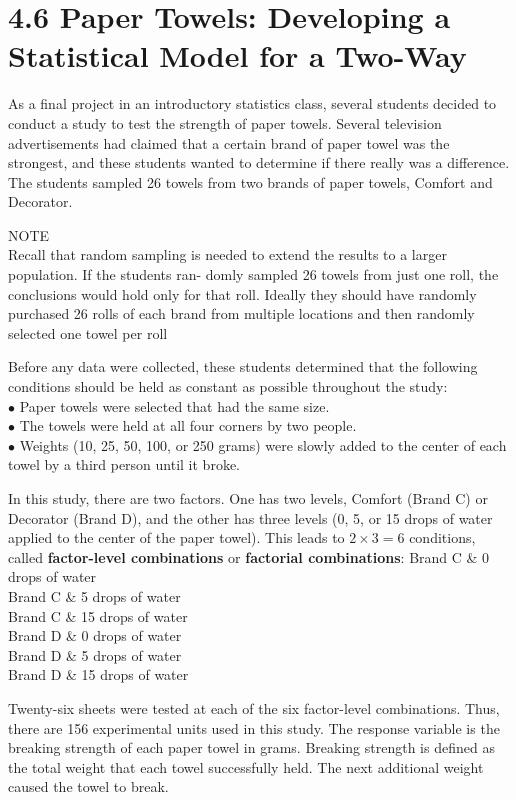 \documentclass[
]{report}
\begin{document}
\chapter{4.6 Paper Towels: Developing a Statistical Model for a Two-Way}\label{paper-towels-developing-a-statistical-model-for-a-two-way}

As a final project in an introductory statistics class, several students decided to conduct a study to test the
strength of paper towels. Several television advertisements had claimed that a certain brand of paper towel was
the strongest, and these students wanted to determine if there really was a difference. The students sampled
26 towels from two brands of paper towels, Comfort and Decorator.

NOTE\\
Recall that random sampling is needed to extend the results to a larger population. If the students ran-
domly sampled 26 towels from just one roll, the conclusions would hold only for that roll. Ideally they
should have randomly purchased 26 rolls of each brand from multiple locations and then randomly
selected one towel per roll

Before any data were collected, these students determined that the following conditions should be held as
constant as possible throughout the study:\\
\(\bullet\) Paper towels were selected that had the same size.\\
\(\bullet\) The towels were held at all four corners by two people.\\
\(\bullet\) Weights (10, 25, 50, 100, or 250 grams) were slowly added to the center of each towel by a third person until it broke.

In this study, there are two factors. One has two levels, Comfort (Brand C) or Decorator (Brand D), and
the other has three levels (0, 5, or 15 drops of water applied to the center of the paper towel). This leads to
\(2 \times 3 = 6\) conditions, called \textbf{factor-level combinations} or \textbf{factorial combinations}:
Brand C \& 0 drops of water\\
Brand C \& 5 drops of water\\
Brand C \& 15 drops of water\\
Brand D \& 0 drops of water\\
Brand D \& 5 drops of water\\
Brand D \& 15 drops of water

Twenty-six sheets were tested at each of the six factor-level combinations. Thus, there are 156 experimental
units used in this study. The response variable is the breaking strength of each paper towel in grams. Breaking
strength is defined as the total weight that each towel successfully held. The next additional weight caused
the towel to break.
\end{document}

